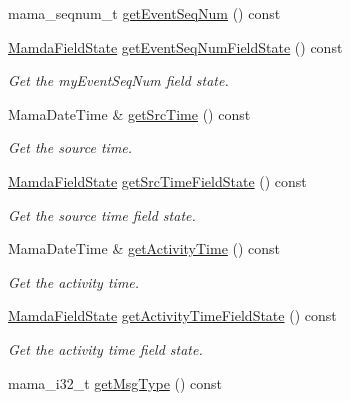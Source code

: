 \begin{CompactItemize}
mama\_\-seqnum\_\-t \hyperlink{classWombat_1_1MamdaOrderImbalanceListener_3a6ecd36b855f2e1f122d07764a6b691}{get\-Event\-Seq\-Num} () const 
\item 
\hyperlink{namespaceWombat_93aac974f2ab713554fd12a1fa3b7d2a}{Mamda\-Field\-State} \hyperlink{classWombat_1_1MamdaOrderImbalanceListener_1daae80b39ea6a070f2fa736fe90437d}{get\-Event\-Seq\-Num\-Field\-State} () const 
\begin{CompactList}\small\item\em Get the my\-Event\-Seq\-Num field state. \item\end{CompactList}\item 
Mama\-Date\-Time \& \hyperlink{classWombat_1_1MamdaOrderImbalanceListener_62085e018b55aee3a14325d692dea2c5}{get\-Src\-Time} () const 
\begin{CompactList}\small\item\em Get the source time. \item\end{CompactList}\item 
\hyperlink{namespaceWombat_93aac974f2ab713554fd12a1fa3b7d2a}{Mamda\-Field\-State} \hyperlink{classWombat_1_1MamdaOrderImbalanceListener_6f070f42d8d7bf1b6260014835020c11}{get\-Src\-Time\-Field\-State} () const 
\begin{CompactList}\small\item\em Get the source time field state. \item\end{CompactList}\item 
Mama\-Date\-Time \& \hyperlink{classWombat_1_1MamdaOrderImbalanceListener_f6441d47955f9cf7d8572a7c6e2816d3}{get\-Activity\-Time} () const 
\begin{CompactList}\small\item\em Get the activity time. \item\end{CompactList}\item 
\hyperlink{namespaceWombat_93aac974f2ab713554fd12a1fa3b7d2a}{Mamda\-Field\-State} \hyperlink{classWombat_1_1MamdaOrderImbalanceListener_e01441cb3be1b7466ece277699971fa3}{get\-Activity\-Time\-Field\-State} () const 
\begin{CompactList}\small\item\em Get the activity time field state. \item\end{CompactList}\item 
mama\_\-i32\_\-t \hyperlink{classWombat_1_1MamdaOrderImbalanceListener_041c934f699fe71fb16d9154bc444bf0}{get\-Msg\-Type} () const 

\end{CompactItemize}
